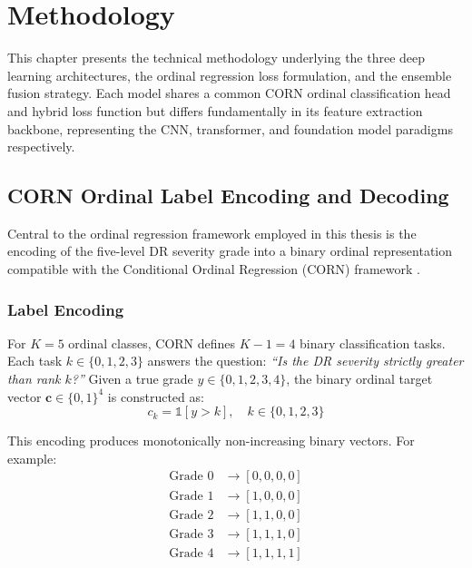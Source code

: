 \chapter{Methodology}
\label{ch:methodology}

This chapter presents the technical methodology underlying the three deep learning architectures, the ordinal regression loss formulation, and the ensemble fusion strategy. Each model shares a common CORN ordinal classification head and hybrid loss function but differs fundamentally in its feature extraction backbone, representing the CNN, transformer, and foundation model paradigms respectively.


\section{CORN Ordinal Label Encoding and Decoding}
\label{sec:corn_encoding}

Central to the ordinal regression framework employed in this thesis is the encoding of the five-level DR severity grade into a binary ordinal representation compatible with the Conditional Ordinal Regression (CORN) framework \cite{shi2021corn}.

\subsection{Label Encoding}

For $K = 5$ ordinal classes, CORN defines $K - 1 = 4$ binary classification tasks. Each task $k \in \{0, 1, 2, 3\}$ answers the question: \emph{``Is the DR severity strictly greater than rank $k$?''} Given a true grade $y \in \{0, 1, 2, 3, 4\}$, the binary ordinal target vector $\mathbf{c} \in \{0, 1\}^{4}$ is constructed as:
\begin{equation}
    c_k = \mathbb{1}[y > k], \quad k \in \{0, 1, 2, 3\}
    \label{eq:corn_encode}
\end{equation}

This encoding produces monotonically non-increasing binary vectors. For example:
\begin{align*}
    \text{Grade } 0 &\rightarrow [0, 0, 0, 0] \\
    \text{Grade } 1 &\rightarrow [1, 0, 0, 0] \\
    \text{Grade } 2 &\rightarrow [1, 1, 0, 0] \\
    \text{Grade } 3 &\rightarrow [1, 1, 1, 0] \\
    \text{Grade } 4 &\rightarrow [1, 1, 1, 1]
\end{align*}

